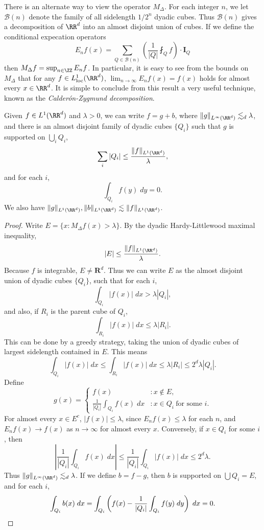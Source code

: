 There is an alternate way to view the operator $M_\Delta$. For each integer $n$, we let $\mathcal{B}(n)$ denote the family of all sidelength $1/2^n$ dyadic cubes. Thus $\mathcal{B}(n)$ gives a decomposition of $\RR^d$ into an almost disjoint union of cubes. If we define the conditional expecation operators
%
\[ E_n f(x) = \sum_{Q \in \mathcal{B}(n)} \left( \frac{1}{|Q|} \fint_Q f \right) \cdot \mathbf{I}_Q \]
%
then $M_\Delta f = \sup_{n \in \ZZ} E_n f$. In particular, it is easy to see from the bounds on $M_\Delta$ that for any $f \in L^1_{\text{loc}}(\RR^d)$, $\lim_{n \to \infty} E_n f(x) = f(x)$ holds for almost every $x \in \RR^d$. It is simple to conclude from this result a very useful technique, known as the \emph{Calder\'{o}n-Zygmund decomposition}.

\begin{theorem}
  Given $f \in L^1(\RR^d)$ and $\lambda > 0$, we can write $f = g + b$, where $\| g \|_{L^\infty(\RR^d)} \lesssim_d \lambda$, and there is an almost disjoint family of dyadic cubes $\{ Q_i \}$ such that $g$ is supported on $\bigcup_i Q_i$,
  \[ \sum_i |Q_i| \leq \frac{\| f \|_{L^1(\RR^d)}}{\lambda}, \]
  and for each $i$,
  \[ \int_{Q_i} f(y)\; dy = 0. \]
  We also have $\| g \|_{L^1(\RR^d)}, \| b \|_{L^1(\RR^d)} \lesssim \| f \|_{L^1(\RR^d)}$.
\end{theorem}
\begin{proof}
  Write $E = \{ x: M_\Delta f(x) > \lambda \}$. By the dyadic Hardy-Littlewood maximal inequality,
  \[ |E| \leq \frac{\| f \|_{L^1(\RR^d)}}{\lambda}. \]
  Because $f$ is integrable, $E \neq \mathbf{R}^d$. Thus we can write $E$ as the almost disjoint union of dyadic cubes $\{ Q_i \}$, such that for each $i$,
  \[ \int_{Q_i} |f(x)|\; dx > \lambda |Q_i|, \]
  and also, if $R_i$ is the parent cube of $Q_i$,
  \[ \int_{R_i} |f(x)|\; dx \leq \lambda |R_i|. \]
  This can be done by a greedy strategy, taking the union of dyadic cubes of largest sidelength contained in $E$. This means
  \[ \int_{Q_i} |f(x)|\; dx \leq \int_{R_i} |f(x)|\; dx \leq \lambda |R_i| \leq 2^d \lambda |Q_i|. \]
  Define
  \[ g(x) = \begin{cases} f(x) &: x \not \in E, \\ \frac{1}{|Q_i|} \int_{Q_i} f(x)\; dx &: x \in Q_i\ \text{for some $i$}. \end{cases} \]
  For almost every $x \in E^c$, $|f(x)| \leq \lambda$, since $E_n f(x) \leq \lambda$ for each $n$, and $E_n f(x) \to f(x)$ as $n \to \infty$ for almost every $x$. Conversely, if $x \in Q_i$ for some $i$, then
  \[ \left| \frac{1}{|Q_i|} \int_{Q_i} f(x)\; dx \right| \leq \frac{1}{|Q_i|} \int_{Q_i} |f(x)|\; dx \leq 2^d \lambda. \]
  Thus $\| g \|_{L^\infty(\RR^d)} \lesssim_d \lambda$. If we define $b = f - g$, then $b$ is supported on $\bigcup Q_i = E$, and for each $i$,
  \[ \int_{Q_i} b(x)\; dx = \int_{Q_i} \left( f(x) - \frac{1}{|Q_i|} \int_{Q_i} f(y)\; dy \right)\; dx = 0. \qedhere \]
\end{proof}

